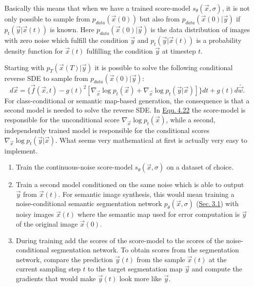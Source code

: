 Basically this means that when we have a trained score-model $s_\theta(\vec{x}, \sigma)$, it is not only possible to sample from $p_{data}(\vec{x}(0))$ but also from $p_{data}(\vec{x}(0)|\vec{y})$ if $p_t(\vec{y}|\vec{x}(t))$ is known. Here $p_{data}(\vec{x}(0)|\vec{y})$ is the data distribution of images with zero noise which fulfill the condition $\vec{y}$ and $p_t(\vec{y}|\vec{x}(t))$ is a probability density function for $\vec{x}(t)$ fulfilling the condition $\vec{y}$ at timestep $t$.

Starting with $p_T(\vec{x}(T)|\vec{y})$ it is possible to solve the following conditional reverse SDE to sample from $p_{data}(\vec{x}(0)|\vec{y})$:
%
\begin{equation} \label{equ:4.22}
    d\vec{x}=\{\vec{f}(\vec{x},t)-g(t)^2[\nabla_{\vec{x}}\log p_t(\vec{x})+\nabla_{\vec{x}}\log p_t(\vec{y}|\vec{x})]\}dt+g(t)d\bar{\vec{w}}.
\end{equation}
%
For class-conditional or semantic map-based generation, the consequence is that a second model is needed to solve the reverse SDE. In \hyperref[equ:4.22]{Equ.\,4.22} the score-model is responsible for the unconditional score $\nabla_{\vec{x}}\log p_t(\vec{x})$, while a second, independently trained model is responsible for the conditional scores $\nabla_{\vec{x}}\log p_t(\vec{y}|\vec{x})$. What seems very mathematical at first is actually very easy to implement.
%
\begin{enumerate}
    \item Train the continuous-noise score-model $s_\theta(\vec{x},\sigma)$ on a dataset of choice.
    \item Train a second model conditioned on the same noise which is able to output $\vec{y}$ from $\vec{x}(t)$. For semantic image synthesis, this would mean training a noise-conditional semantic segmentation network $p_\theta(\vec{x}, \sigma)$ (\hyperref[sec:3.1]{Sec.\,3.1}) with noisy images $\vec{x}(t)$ where the semantic map used for error computation is $\vec{y}$ of the original image $\vec{x}(0)$.
    \item During training add the scores of the score-model to the scores of the noise-conditional segmentation network. To obtain scores from the segmentation network, compare the prediction $\vec{y}(t)$ from the sample $\vec{x}(t)$ at the current sampling step $t$ to the target segmentation map $\vec{y}$ and compute the gradients that would make $\vec{y}(t)$ look more like $\vec{y}$.
\end{enumerate}

